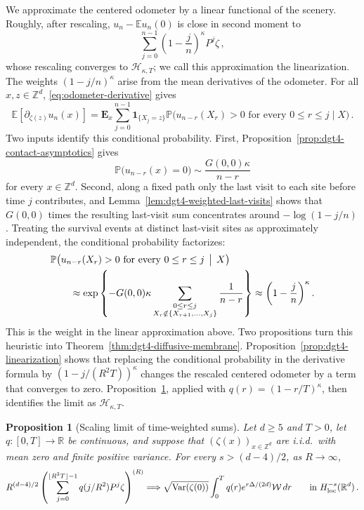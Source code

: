 \documentclass[11pt]{amsart}
\theoremstyle{plain}
\newtheorem{proposition}[theorem]{Proposition}
\theoremstyle{definition}
\newcommand{\Z}{\mathbb{Z}}
\newcommand{\R}{\mathbb{R}}
\newcommand{\E}{\mathbb{E}}
\renewcommand{\P}{\mathbb{P}}
\DeclareMathOperator{\Var}{Var}
\newcommand{\one}{\mathbf{1}}
\begin{document}
	We approximate the centered odometer by a linear functional of the scenery.
	Roughly, after rescaling, $u_n-\E u_n(0)$ is close in second moment to
	\[
		\sum_{j=0}^{n-1}\left(1-\frac jn\right)^\kappa P^j\zeta\, ,
	\]
	whose rescaling converges to $\mathcal H_{\kappa,T}$; we call this approximation
	the linearization. The weights $(1-j/n)^\kappa$ arise from the mean derivatives
	of the odometer. For all $x,z\in\Z^d$, \eqref{eq:odometer-derivative} gives
	\[
	\E[\partial_{\zeta(z)}u_n(x)]
	=\mathbf E_x\sum_{j=0}^{n-1}
	\one_{\{X_j=z\}}
	\P\bigl(u_{n-r}(X_r)>0\text{ for every }0\leq r\leq j\mid X\bigr)\, .
	\]
	Two inputs identify this conditional probability. First, Proposition~\ref{prop:dgt4-contact-asymptotics} gives
	\[
		\P\bigl(u_{n-r}(x)=0\bigr)
		\sim\frac{G(0,0)\kappa}{n-r}
	\]
	for every $x\in\Z^d$. Second, along a fixed path only the last visit to each site before time $j$
	contributes, and Lemma~\ref{lem:dgt4-weighted-last-visits} shows that $G(0,0)$ times the
	resulting last-visit sum concentrates around $-\log(1-j/n)$.
	Treating the survival events at distinct last-visit sites as approximately
	independent, the conditional probability factorizes:
	\[
	\begin{aligned}
	&\P\bigl(u_{n-r}(X_r)>0\text{ for every }0\leq r\leq j
	\,\bigm|\,X\bigr)\\
	&\qquad\approx
	\exp\left\{
	-G(0,0)\kappa
	\sum_{\substack{0\leq r\leq j\\
	X_r\notin\{X_{r+1},\ldots,X_j\}}}
	\frac1{n-r}
	\right\}
	\approx
	\left(1-\frac jn\right)^\kappa .
	\end{aligned}
	\]
	This is the weight in the linear approximation above. Two propositions turn
	this heuristic into Theorem~\ref{thm:dgt4-diffusive-membrane}.
	Proposition~\ref{prop:dgt4-linearization} shows that replacing the conditional
	probability in the derivative formula by $(1-j/(R^2T))^\kappa$ changes the
	rescaled centered odometer by a term that converges to zero.
	Proposition~\ref{prop:weighted-membrane-limit}, applied with
	$q(r)=(1-r/T)^\kappa$, then identifies the limit as $\mathcal H_{\kappa,T}$.

\begin{proposition}[Scaling limit of time-weighted sums]\label{prop:weighted-membrane-limit}
	Let $d\geq5$ and $T>0$, let $q:[0,T]\to\R$ be continuous, and suppose that
	$(\zeta(x))_{x\in\Z^d}$ are i.i.d.\ with mean zero and finite positive variance.
	For every $s>(d-4)/2$, as $R\to\infty$,
	\[
		R^{(d-4)/2}
		\left(\sum_{j=0}^{\lfloor R^2T\rfloor-1}q(j/R^2)P^j\zeta\right)^{(R)}
		\Longrightarrow
		\sqrt{\Var(\zeta(0))}\int_0^Tq(r)e^{r\Delta/(2d)}\mathcal W\,dr
		\qquad\text{in }H^{-s}_{\rm loc}(\R^d)\, .
	\]
\end{proposition}
\end{document}
